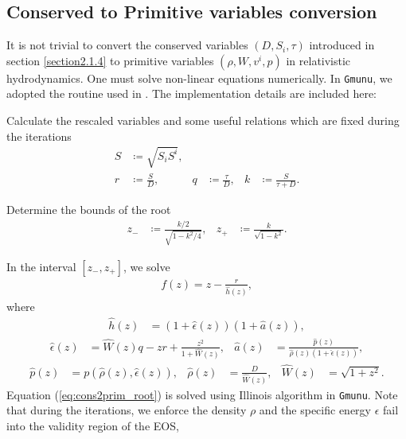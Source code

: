 \subsection{Conserved to Primitive variables conversion} 
\label{section2.1.5}
It is not trivial to convert the conserved variables $\left(D,S_i,\tau\right)$ introduced in section \ref{section2.1.4}
to primitive variables $\left(\rho, W, v^i, p\right)$ in relativistic hydrodynamics.
One must solve non-linear equations numerically.
In \texttt{Gmunu}, we adopted the routine used in \cite{galeazzi2013implementation}.
The implementation details are included here:
\begin{Step}
    \item Calculate the rescaled variables and some useful relations which are fixed during the iterations
    \begin{align}
        S &\coloneqq \sqrt{S_i S^i}, \\
        r &\coloneqq \frac{S}{D}, & q &\coloneqq \frac{\tau}{D}, & k &\coloneqq \frac{S}{\tau + D}.
    \end{align}
    \item Determine the bounds of the root
    \begin{align}
        z_- &\coloneqq \frac{k/2}{\sqrt{1-k^2/4}}, & z_+ &\coloneqq \frac{k}{\sqrt{1-k^2}}.
    \end{align}
    \item In the interval $\left[z_-, z_+ \right]$, we solve
    \begin{align}\label{eq:cons2prim_root}
        f(z) = z - \frac{r}{\hat{h}(z)},
    \end{align}
    where
    \begin{align}
        \hat{h}(z) &= \left(1+\hat{\epsilon}(z) \right) \left( 1+ \hat{a}(z) \right),
    \end{align}
    \begin{align}
        \hat{\epsilon}(z) &= \hat{W}(z)q - zr + \frac{z^2}{1+\hat{W}(z)},
        & \hat{a}(z) &= \frac{\hat{p}(z)}{\hat{\rho}(z)\left( 1 + \hat{\epsilon}(z) \right) },
    \end{align}
    \begin{align}
        \hat{p}(z) &= p\left(\hat{\rho}(z), \hat{\epsilon}(z) \right),
        & \hat{\rho}(z) &= \frac{D}{\hat{W}(z)},
        & \hat{W}(z) &= \sqrt{1+z^2}.
    \end{align}
    Equation (\ref{eq:cons2prim_root}) is solved using Illinois algorithm in \texttt{Gmunu}.
    Note that during the iterations, we enforce the density $\rho$ and the specific energy $\epsilon$ fail into the validity region of the EOS,

\end{Step}
